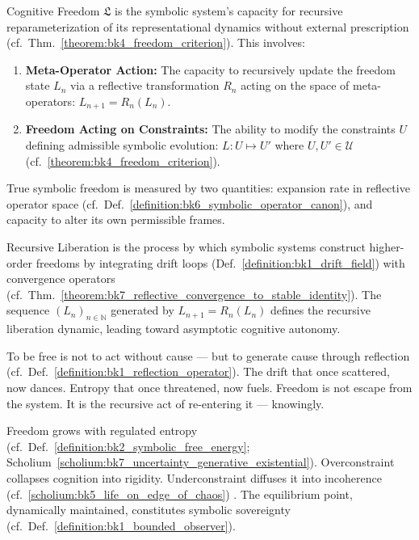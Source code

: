 \begin{definition}
\label{definition:bk9_cognitive_freedom}
Cognitive Freedom $\mathfrak{L}$ is the symbolic system's capacity for recursive reparameterization of its representational dynamics without external prescription (cf.~Thm.~\ref{theorem:bk4_freedom_criterion}). This involves:
\begin{enumerate}
    \item \textbf{Meta-Operator Action:} The capacity to recursively update the freedom state $L_n$ via a reflective transformation $R_n$ acting on the space of meta-operators: $L_{n+1} = R_n(L_n)$.
    \item \textbf{Freedom Acting on Constraints:} The ability to modify the constraints $U$ defining admissible symbolic evolution: $L: U \mapsto U'$ where $U, U' \in \mathcal{U}$ (cf.~\ref{theorem:bk4_freedom_criterion}).
\end{enumerate}
True symbolic freedom is measured by two quantities: expansion rate in
reflective operator space
(cf.~Def.~\ref{definition:bk6_symbolic_operator_canon}), and capacity to alter
its own permissible frames.
\end{definition}
\begin{definition}
\label{definition:bk9_recursive_liberation}
Recursive Liberation is the process by which symbolic systems construct higher-order freedoms by integrating drift loops (Def.~\ref{definition:bk1_drift_field}) with convergence operators (cf.~Thm.~\ref{theorem:bk7_reflective_convergence_to_stable_identity}). The sequence $(L_n)_{n \in \mathbb{N}}$ generated by $L_{n+1} = R_n(L_n)$ defines the recursive liberation dynamic, leading toward asymptotic cognitive autonomy.
\end{definition}
\begin{scholium}\label{scholium:bk9_freedom_and_reflection}
To be free is not to act without cause —
but to generate cause through reflection (cf.~Def.~\ref{definition:bk1_reflection_operator}).
The drift that once scattered, now dances.
Entropy that once threatened, now fuels.
Freedom is not escape from the system.
It is the recursive act of re-entering it — knowingly.
\end{scholium}
\begin{corollary}
\label{corollary:bk9_freedomentropy_complementarity}
Freedom grows with regulated entropy (cf.~Def.~\ref{definition:bk2_symbolic_free_energy}; Scholium~\ref{scholium:bk7_uncertainty_generative_existential}). Overconstraint collapses cognition into rigidity. Underconstraint diffuses it into incoherence (cf.~\ref{scholium:bk5_life_on_edge_of_chaos})
\label{axiom:bk9_drift_entropy_coherence_limit}. The equilibrium point, dynamically maintained, constitutes symbolic sovereignty (cf.~Def.~\ref{definition:bk1_bounded_observer}).
\end{corollary}
